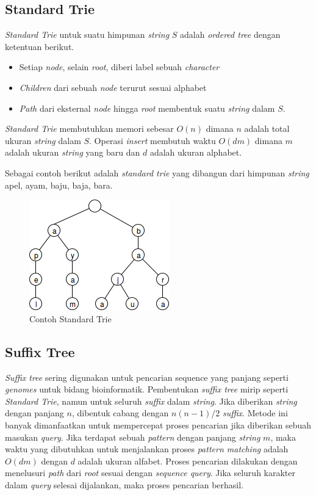 \subsection{Standard Trie}
\textit{Standard Trie} untuk suatu himpunan \textit{string} $S$ adalah \textit{ordered tree} dengan ketentuan berikut.
\begin{itemize}
  \item Setiap \textit{node}, selain \textit{root}, diberi label sebuah \textit{character}
  \item \textit{Children} dari sebuah \textit{node} terurut sesuai alphabet
  \item \textit{Path} dari eksternal \textit{node} hingga \textit{root} membentuk suatu \textit{string} dalam $S$.
\end{itemize}
\textit{Standard Trie} membutuhkan memori sebesar $O(n)$ dimana $n$ adalah total ukuran \textit{string} dalam $S$. Operasi \textit{insert} membutuh waktu $O(dm)$ dimana $m$ adalah ukuran \textit{string} yang baru dan $d$ adalah ukuran alphabet.

Sebagai contoh berikut adalah \textit{standard trie} yang dibangun dari himpunan \textit{string} {apel, ayam, baju, baja, bara}.
\begin{figure}
    \centering
    \includegraphics[scale=0.6]{pics/Contoh-StandardTrie}
    \caption{Contoh Standard Trie}
    \label{fig:contoh-standard-trie}
\end{figure}

\subsection{Suffix Tree}
\textit{Suffix tree} sering digunakan untuk pencarian sequence yang panjang seperti \textit{genomes} untuk bidang bioinformatik. Pembentukan \textit{suffix tree} mirip seperti \textit{Standard Trie}, namun untuk seluruh \textit{suffix} dalam \textit{string}. Jika diberikan \textit{string} dengan panjang $n$, dibentuk cabang dengan $n(n-1)/2$ \textit{suffix}.  Metode ini banyak dimanfaatkan untuk mempercepat proses pencarian jika diberikan sebuah masukan \textit{query}. Jika terdapat sebuah \textit{pattern} dengan panjang \textit{string} $m$, maka waktu yang dibutuhkan untuk menjalankan proses \textit{pattern matching} adalah $O(dm)$ dengan $d$ adalah ukuran alfabet. Proses pencarian dilakukan dengan menelusuri \textit{path} dari \textit{root} sesuai dengan \textit{sequence query}. Jika seluruh karakter dalam \textit{query} selesai dijalankan, maka proses pencarian berhasil. 

